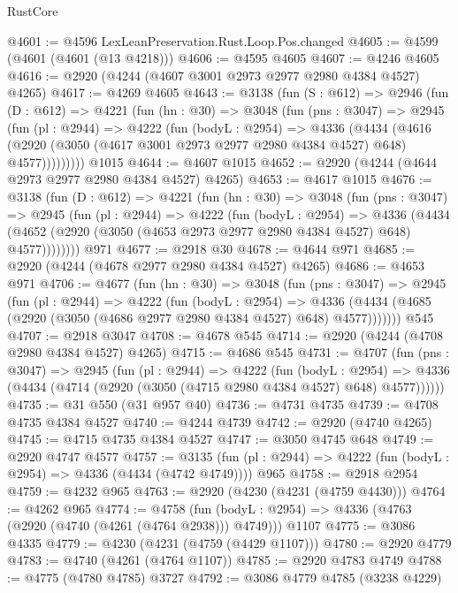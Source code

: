 \begin{lexlean}{RustCore}
\begin{coremodule}
@4601 := @4596 LexLeanPreservation.Rust.Loop.Pos.changed
@4605 := @4599 (@4601 (@4601 (@13 @4218)))
@4606 := @4595 @4605
@4607 := @4246 @4605
@4616 := @2920 (@4244 (@4607 @3001 @2973 @2977 @2980 @4384 @4527) @4265)
@4617 := @4269 @4605
@4643 := @3138
    (fun (S : @612) =>
    @2946
      (fun (D : @612) =>
      @4221
        (fun (hn : @30) =>
        @3048
          (fun (pns : @3047) =>
          @2945
            (fun (pl : @2944) =>
            @4222
              (fun (bodyL : @2954) =>
              @4336
                (@4434
                  (@4616
                    (@2920 (@3050 (@4617 @3001 @2973 @2977 @2980 @4384 @4527) @648) @4577)))))))))
    @1015
@4644 := @4607 @1015
@4652 := @2920 (@4244 (@4644 @2973 @2977 @2980 @4384 @4527) @4265)
@4653 := @4617 @1015
@4676 := @3138
    (fun (D : @612) =>
    @4221
      (fun (hn : @30) =>
      @3048
        (fun (pns : @3047) =>
        @2945
          (fun (pl : @2944) =>
          @4222
            (fun (bodyL : @2954) =>
            @4336
              (@4434 (@4652 (@2920 (@3050 (@4653 @2973 @2977 @2980 @4384 @4527) @648) @4577))))))))
    @971
@4677 := @2918 @30
@4678 := @4644 @971
@4685 := @2920 (@4244 (@4678 @2977 @2980 @4384 @4527) @4265)
@4686 := @4653 @971
@4706 := @4677
    (fun (hn : @30) =>
    @3048
      (fun (pns : @3047) =>
      @2945
        (fun (pl : @2944) =>
        @4222
          (fun (bodyL : @2954) =>
          @4336 (@4434 (@4685 (@2920 (@3050 (@4686 @2977 @2980 @4384 @4527) @648) @4577)))))))
    @545
@4707 := @2918 @3047
@4708 := @4678 @545
@4714 := @2920 (@4244 (@4708 @2980 @4384 @4527) @4265)
@4715 := @4686 @545
@4731 := @4707
    (fun (pns : @3047) =>
    @2945
      (fun (pl : @2944) =>
      @4222
        (fun (bodyL : @2954) =>
        @4336 (@4434 (@4714 (@2920 (@3050 (@4715 @2980 @4384 @4527) @648) @4577))))))
@4735 := @31 @550 (@31 @957 @40)
@4736 := @4731 @4735
@4739 := @4708 @4735 @4384 @4527
@4740 := @4244 @4739
@4742 := @2920 (@4740 @4265)
@4745 := @4715 @4735 @4384 @4527
@4747 := @3050 @4745 @648
@4749 := @2920 @4747 @4577
@4757 := @3135 (fun (pl : @2944) => @4222 (fun (bodyL : @2954) => @4336 (@4434 (@4742 @4749)))) @965
@4758 := @2918 @2954
@4759 := @4232 @965
@4763 := @2920 (@4230 (@4231 (@4759 @4430)))
@4764 := @4262 @965
@4774 := @4758
    (fun (bodyL : @2954) => @4336 (@4763 (@2920 (@4740 (@4261 (@4764 @2938))) @4749)))
    @1107
@4775 := @3086 @4335
@4779 := @4230 (@4231 (@4759 (@4429 @1107)))
@4780 := @2920 @4779
@4783 := @4740 (@4261 (@4764 @1107))
@4785 := @2920 @4783 @4749
@4788 := @4775 (@4780 @4785) @3727
@4792 := @3086 @4779 @4785 (@3238 @4229)

\end{coremodule}
\end{lexlean}
